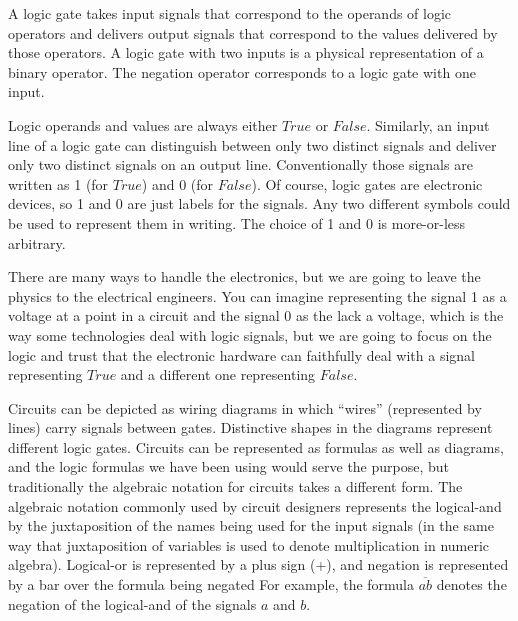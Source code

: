 A logic gate takes input signals that correspond
to the operands of logic operators and delivers output signals
that correspond to the values delivered by those operators.
A logic gate with two inputs is a physical representation of
a binary operator. The negation operator corresponds to a
logic gate with one input.

Logic operands and values are always either $True$ or $False$.
Similarly, an input line of a logic gate can distinguish between
only two distinct signals
and deliver only two distinct signals on an output line.
Conventionally those signals are written as 1 (for $True$) and 0 (for $False$).
Of course, logic gates are electronic devices,
so 1 and 0 are just labels for the signals.
Any two different symbols could be used to represent them in writing.
The choice of 1 and 0 is more-or-less arbitrary.

There are many ways to handle the electronics,
but we are going to leave the physics to the electrical engineers.
You can imagine representing the signal 1 as
a voltage at a point in a circuit and the signal 0 as
the lack a voltage, which is the way some technologies
deal with logic signals,
but we are going to focus on the logic and trust that
the electronic hardware can faithfully deal with
a signal representing $True$ and a different one representing $False$.

Circuits can be depicted as wiring diagrams
in which ``wires'' (represented by lines) carry signals between gates.
Distinctive shapes in the diagrams represent different logic gates.
Circuits can be represented as formulas as well as diagrams, and
the logic formulas we have been using would serve the purpose,
but traditionally the algebraic notation for circuits takes a
different form.
The algebraic notation commonly used by circuit
designers represents the logical-and by the juxtaposition
of the names being used for the input signals (in the same way
that juxtaposition of variables is used to denote multiplication
in numeric algebra). Logical-or is represented by a plus sign (+),
and negation is represented by a bar over the formula being negated
For example, the formula $\overline{ab}$ denotes the negation of the logical-and
of the signals $a$ and $b$.

